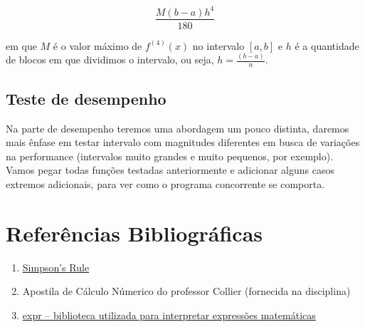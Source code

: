 \documentclass{article}
\begin{document}
$$
\frac{M(b - a)h^4}{180}
$$

em que $M$ é o valor máximo de $f^{(4)}(x)$ no intervalo $[a, b]$ e $h$ é a quantidade de blocos em que dividimos o intervalo, ou seja, $h = \frac{(b - a)}{n}$.

\subsection{Teste de desempenho}
Na parte de desempenho teremos uma abordagem um pouco distinta, daremos mais ênfase em testar intervalo com magnitudes diferentes
em busca de variações na performance (intervalos muito grandes e muito pequenos, por exemplo). Vamos pegar todas funções testadas anteriormente e adicionar alguns casos extremos adicionais, para
ver como o programa concorrente se comporta.

\section{Referências Bibliográficas}

\begin{enumerate}
    \item \href{https://www.wikiwand.com/en/Simpson%27s_rule#/Simpson's_rules_in_the_case_of_narrow_peaks}{Simpson's Rule}
    \item Apostila de Cálculo Númerico do professor Collier (fornecida na disciplina)
    \item \href{https://github.com/zserge/expr}{expr -- biblioteca utilizada para interpretar expressões matemáticas}
\end{enumerate}
\end{document}
